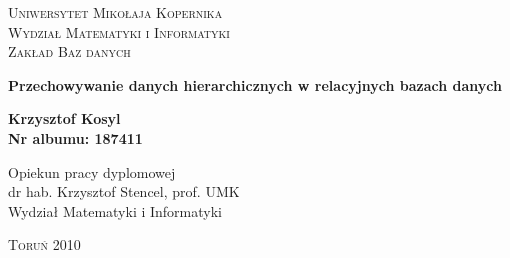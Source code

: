 

\begin{titlepage}
    \begin{center}
        \Large\scshape Uniwersytet Mikołaja Kopernika\\
        Wydział Matematyki i Informatyki\\
        Zakład Baz danych
    \end{center}
    \vspace{22ex}
    \begin{center}
        \Huge\bfseries
        Przechowywanie danych hierarchicznych w relacyjnych bazach danych
    \end{center}
    \vspace{22ex}
    \begin{center}
        \Large\bfseries
        Krzysztof Kosyl \\
        \vspace{0.5ex}
        \normalsize
        Nr albumu: 187411
    \end{center}
    \vspace{19ex}
    \hspace*{\fill}
    \parbox{0.50\textwidth}{\setlength{\parindent}{1em}
            \normalsize
            \noindent
            Opiekun pracy dyplomowej\\
            dr hab. Krzysztof Stencel, prof. UMK\\
            Wydział Matematyki i Informatyki}
    \vfill
    \centerline{\textsc{Toruń} 2010}
    \addtocounter{page}{-1}
\end{titlepage}

